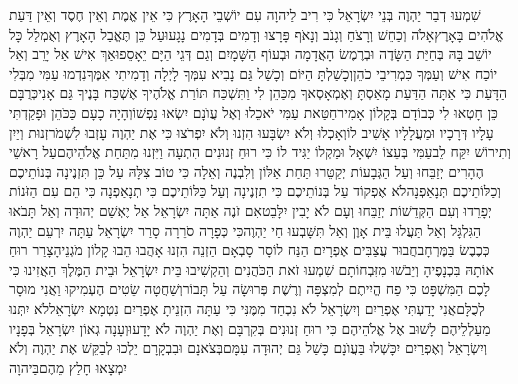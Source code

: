 \documentclass[../main/main.tex]{subfiles}
\begin{document}
\begin{multicols*}{\ncols}
שִׁמְעוּ דְבַר יַהְוֶה בְּנֵי יִשְׂרָאֵל כִּי רִיב לַיהוָה עִם יוֹשְׁבֵי הָאָרֶץ כִּי אֵין אֱמֶת וְאֵין חֶסֶד וְאֵין דַּעַת אֱלֹהִים בָּאָרֶץ\PreVerseSpace{}אָלֹה וְכַחֵשׁ וְרָצֹחַ וְגָנֹב וְנָאֹף פָּרָצוּ וְדָמִים בְּדָמִים נָגָעוּ\PreVerseSpace{}עַל כֵּן תֶּאֱבַל הָאָרֶץ וְאֻמְלַל כָּל יוֹשֵׁב בָּהּ בְּחַיַּת הַשָּׂדֶה וּבְרֶמֶשׂ הָאֲדָמָה\OmitEnd{} וּבְעוֹף הַשָּׁמָיִם וְגַם דְּגֵי הַיָּם יֵאָסֵפוּ\PreVerseSpace{}אַךְ אִישׁ אַל יָרֵב וְאַל יוֹכַח אִישׁ וְעַמְּךָ כִּמְרִיבֵי כֹהֵן\PreVerseSpace{}וְכָשַׁלְתָּ הַיּוֹם וְכָשַׁל גַּם נָבִיא עִמְּךָ לָיְלָה וְדָמִיתִי אִמֶּךָ\PreVerseSpace{}נִדְמוּ עַמִּי מִבְּלִי הַדָּעַת כִּי אַתָּה הַדַּעַת מָאַסְתָּ וְאֶמְאָסְאךָ מִכַּהֵן לִי וַתִּשְׁכַּח תּוֹרַת אֱלֹהֶיךָ אֶשְׁכַּח בָּנֶיךָ גַּם אָנִי\PreVerseSpace{}כְּרֻבָּם כֵּן חָטְאוּ לִי כְּבוֹדָם בְּקָלוֹן אָמִיר\PreVerseSpace{}חַטַּאת עַמִּי יֹאכֵלוּ וְאֶל עֲוֺנָם יִשְׂאוּ נַפְשׁוֹ\PreVerseSpace{}וְהָיָה כָעָם כַּכֹּהֵן וּפָקַדְתִּי עָלָיו דְּרָכָיו וּמַעֲלָלָיו אָשִׁיב לוֹ\PreVerseSpace{}וְאָכְלוּ וְלֹא יִשְׂבָּעוּ הִזְנוּ וְלֹא יִפְרֹצוּ כִּי אֶת יַהְוֶה עָזְבוּ לִשְׁמֹר\PreVerseSpace{}זְנוּת וְיַיִן וְתִירוֹשׁ יִקַּח לֵב\PreVerseSpace{}עַמִּי בְּעֵצוֹ יִשְׁאָל וּמַקְלוֹ יַגִּיד לוֹ כִּי רוּחַ זְנוּנִים הִתְעָה וַיִּזְנוּ מִתַּחַת אֱלֹהֵיהֶם\PreVerseSpace{}עַל רָאשֵׁי הֶהָרִים יְזַבֵּחוּ וְעַל הַגְּבָעוֹת יְקַטֵּרוּ תַּחַת אַלּוֹן וְלִבְנֶה וְאֵלָה כִּי טוֹב צִלָּהּ עַל כֵּן תִּזְנֶינָה בְּנוֹתֵיכֶם וְכַלּוֹתֵיכֶם תְּנָאַפְנָה\PreVerseSpace{}לֹא אֶפְקוֹד עַל בְּנוֹתֵיכֶם כִּי תִזְנֶינָה וְעַל כַּלּוֹתֵיכֶם כִּי תְנָאַפְנָה כִּי הֵם עִם הַזֹּנוֹת יְפָרֵדוּ וְעִם הַקְּדֵשׁוֹת יְזַבֵּחוּ וְעָם לֹא יָבִין יִלָּבֵט\PreVerseSpace{}אִם זֹנֶה אַתָּה יִשְׂרָאֵל אַל יֶאְשַׁם יְהוּדָה וְאַל תָּבֹאוּ הַגִּלְגָּל וְאַל תַּעֲלוּ בֵּית אָוֶן וְאַל תִּשָּׁבְעוּ חַי יַהְוֶה\PreVerseSpace{}כִּי כְּפָרָה סֹרֵרָה סָרַר יִשְׂרָאֵל עַתָּה יִרְעֵם יַהְוֶה כְּכֶבֶשׂ בַּמֶּרְחָב\PreVerseSpace{}חֲבוּר עֲצַבִּים אֶפְרָיִם הַנַּח לוֹ\PreVerseSpace{}סָר סָבְאָם הַזְנֵה הִזְנוּ אָהֲבוּ הֵבוּ קָלוֹן מֹגְנֵיהָ\SubEnd{}\PreVerseSpace{}צָרַר רוּחַ אוֹתָהּ בִּכְנָפֶיהָ וְיֵבֹשׁוּ מִזִּבְחוֹתָם \ClosedSection{}שִׁמְעוּ זֹאת הַכֹּהֲנִים וְהַקְשִׁיבוּ בֵּית יִשְׂרָאֵל וּבֵית הַמֶּלֶךְ הַאֲזִינוּ כִּי לָכֶם הַמִּשְׁפָּט כִּי פַח הֱיִיתֶם לְמִצְפָּה וְרֶשֶׁת פְּרוּשָׂה עַל תָּבוֹר\PreVerseSpace{}וְשַׁחֲטָה שֵׂטִים הֶעְמִיקוּ וַאֲנִי מוּסָר לְכֻלָּם\PreVerseSpace{}אֲנִי יָדַעְתִּי אֶפְרַיִם וְיִשְׂרָאֵל לֹא נִכְחַד מִמֶּנִּי כִּי עַתָּה הִזְנֵיתָ אֶפְרַיִם נִטְמָא יִשְׂרָאֵל\PreVerseSpace{}לֹא יִתְּנוּ מַעַלְלֵיהֶם לָשׁוּב אֶל אֱלֹהֵיהֶם כִּי רוּחַ זְנוּנִים בְּקִרְבָּם וְאֶת יַהְוֶה לֹא יָדָעוּ\PreVerseSpace{}וְעָנָה גְאוֹן יִשְׂרָאֵל בְּפָנָיו וְיִשְׂרָאֵל וְאֶפְרַיִם יִכָּשְׁלוּ בַּעֲוֺנָם כָּשַׁל גַּם יְהוּדָה עִמָּם\PreVerseSpace{}בְּצֹאנָם וּבִבְקָרָם יֵלְכוּ לְבַקֵּשׁ אֶת יַהְוֶה וְלֹא יִמְצָאוּ חָלַץ מֵהֶם\PreVerseSpace{}בַּיהוָה 
\end{multicols*}
\end{document}
